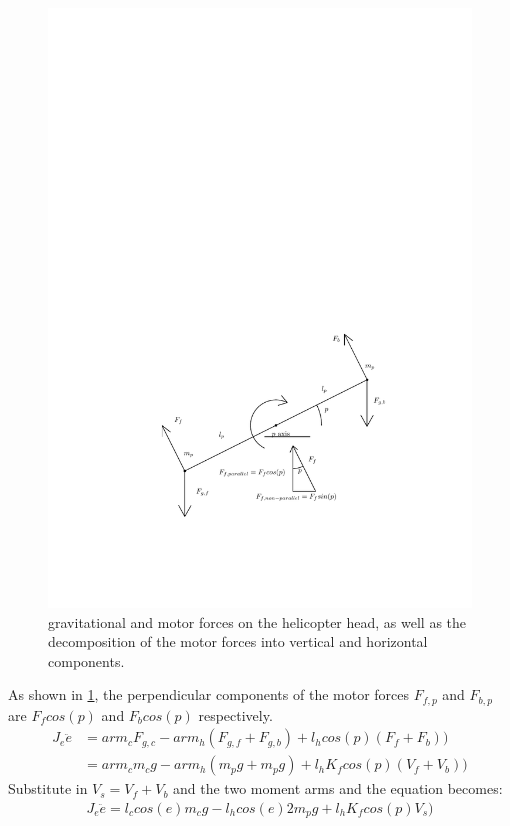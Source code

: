 \begin{figure}[H]
  \caption{gravitational and motor forces on the helicopter head, as
    well as the decomposition of the motor forces into vertical and
    horizontal components.}
  \label{fig:pitch_model}
  \includegraphics[width=1\textwidth]{images/pitch_model}
\end{figure}
%
As shown in \cref{fig:pitch_model}, the perpendicular components of the
motor forces $F_{f,p}$ and $F_{b,p}$ are $F_fcos(p)$ and $F_bcos(p)$
respectively.
%
\begin{align*}
  J_e\ddot{e} &= arm_cF_{g,c} - arm_h(F_{g,f}+F_{g,b}) + l_hcos(p)(F_f + F_b)) \\
              &= arm_cm_cg - arm_h(m_pg + m_pg) + l_hK_fcos(p)(V_f + V_b))
\end{align*}
%
Substitute in $V_s = V_f + V_b$ and the two moment arms and the equation becomes:
%
\begin{align*}
  J_e\ddot{e} = l_ccos(e)m_cg - l_hcos(e)2m_pg + l_hK_fcos(p)V_s)
\end{align*}
